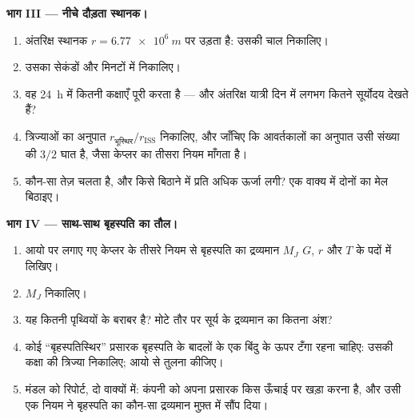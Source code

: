 \begin{problem}
\medskip
\noindent\textbf{भाग III --- नीचे दौड़ता स्थानक।}
\begin{enumerate}[resume]
  \item अंतरिक्ष स्थानक $r = \qty{6.77e6}{m}$ पर उड़ता है: उसकी चाल निकालिए।
  \item उसका  सेकंडों और मिनटों में निकालिए।
  \item वह \qty{24}{h} में कितनी कक्षाएँ पूरी करता है --- और अंतरिक्ष
        यात्री दिन में लगभग कितने सूर्योदय देखते हैं?
  \item त्रिज्याओं का अनुपात $r_{\text{भूस्थिर}}/r_{\text{ISS}}$ निकालिए, और जाँचिए कि
        आवर्तकालों का अनुपात उसी संख्या की $3/2$ घात है,
        जैसा केप्लर का तीसरा नियम माँगता है।
  \item कौन-सा  तेज़ चलता है, और किसे बिठाने में प्रति
         अधिक ऊर्जा लगी? एक वाक्य में दोनों का
        मेल बिठाइए।
\end{enumerate}

\medskip
\noindent\textbf{भाग IV --- साथ-साथ बृहस्पति का तौल।}
\begin{enumerate}[resume]
  \item आयो पर लगाए गए केप्लर के तीसरे नियम से बृहस्पति का द्रव्यमान $M_J$
        $G$, $r$ और $T$ के पदों में लिखिए।
  \item $M_J$ निकालिए।
  \item यह कितनी पृथ्वियों के बराबर है? मोटे तौर पर सूर्य के द्रव्यमान का
        कितना अंश?
  \item कोई ``बृहस्पतिस्थिर'' प्रसारक बृहस्पति के बादलों के एक बिंदु के ऊपर
        टँगा रहना चाहिए: उसकी कक्षा की त्रिज्या निकालिए; आयो से
        तुलना कीजिए।
  \item मंडल को रिपोर्ट, दो वाक्यों में: कंपनी को अपना प्रसारक किस ऊँचाई पर
        खड़ा करना है, और उसी एक नियम ने बृहस्पति का कौन-सा द्रव्यमान मुफ़्त
        में सौंप दिया।
\end{enumerate}
\end{problem}
